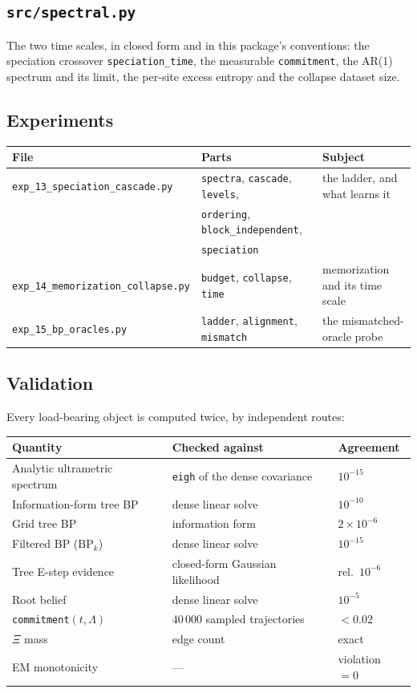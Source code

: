 \documentclass[11pt]{article}
\theoremstyle{remark}
\newcommand{\Xis}{\Xi}
\newcommand{\code}[1]{\texttt{\small #1}}
\begin{document}
\subsection{\code{src/spectral.py}}

The two time scales, in closed form and in this package's conventions:
the speciation crossover \code{speciation\_time}, the measurable
\code{commitment}, the AR(1) spectrum and its limit, the per-site excess entropy
and the collapse dataset size.

\subsection{Experiments}

\begin{center}\small
\begin{tabular}{@{}lll@{}}
\toprule
File & Parts & Subject \\
\midrule
\code{exp\_13\_speciation\_cascade.py} &
  \code{spectra}, \code{cascade}, \code{levels}, &
  the ladder, and what learns it \\
 & \code{ordering}, \code{block\_independent}, & \\
 & \code{speciation} & \\
\code{exp\_14\_memorization\_collapse.py} &
  \code{budget}, \code{collapse}, \code{time} &
  memorization and its time scale \\
\code{exp\_15\_bp\_oracles.py} &
  \code{ladder}, \code{alignment}, \code{mismatch} &
  the mismatched-oracle probe \\
\bottomrule
\end{tabular}
\end{center}

\subsection{Validation}

Every load-bearing object is computed twice, by independent routes:

\begin{center}
\begin{tabular}{@{}lll@{}}
\toprule
Quantity & Checked against & Agreement \\
\midrule
Analytic ultrametric spectrum & \code{eigh} of the dense covariance & $10^{-15}$ \\
Information-form tree BP & dense linear solve & $10^{-10}$ \\
Grid tree BP & information form & $2\times 10^{-6}$ \\
Filtered BP ($\mathrm{BP}_k$) & dense linear solve & $10^{-15}$ \\
Tree E-step evidence & closed-form Gaussian likelihood & rel.\ $10^{-6}$ \\
Root belief & dense linear solve & $10^{-5}$ \\
\code{commitment}$(t,\Lambda)$ & 40\,000 sampled trajectories & $<0.02$ \\
$\Xis$ mass & edge count & exact \\
EM monotonicity & --- & violation $=0$ \\
\bottomrule
\end{tabular}
\end{center}
\end{document}
